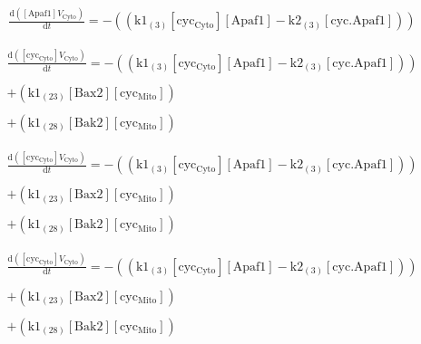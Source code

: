 \documentclass[a4paper,12pt]{article} %
\newcommand{\M}[1]{\mathrm{#1}}
\begin{document}
\begin{equation}
\begin{split}
\frac {\M{d}( {{\M{[Apaf1]}}    {V}_{\M{Cyto}} } ) }  {\M{d}{t} }  =  {  -  (( {{\M{k1}}_{\M{(3)}}    {\M{[cyc_{Cyto}]}}    {\M{[Apaf1]}}  -  {\M{k2}}_{\M{(3)}}    {\M{[cyc.Apaf1]}} } )) } 
\end{split}
\end{equation}


\begin{equation}
\begin{split}
\frac {\M{d}( {{\M{[cyc_{Cyto}]}}    {V}_{\M{Cyto}} } ) }  {\M{d}{t} }  =  {  -  (( {{\M{k1}}_{\M{(3)}}    {\M{[cyc_{Cyto}]}}    {\M{[Apaf1]}}  -  {\M{k2}}_{\M{(3)}}    {\M{[cyc.Apaf1]}} } )) } \\ 
  \\ 
   {  +  ( {{\M{k1}}_{\M{(23)}}    {\M{[Bax2]}}    {\M{[cyc_{Mito}]}} } ) } \\ 
  \\ 
   {  +  ( {{\M{k1}}_{\M{(28)}}    {\M{[Bak2]}}    {\M{[cyc_{Mito}]}} } ) } 
\end{split}
\end{equation}

\begin{equation}
\begin{split}
\frac {\M{d}( {{\M{[cyc_{Cyto}]}}    {V}_{\M{Cyto}} } ) }  {\M{d}{t} }  =  {  -  (( {{\M{k1}}_{\M{(3)}}    {\M{[cyc_{Cyto}]}}    {\M{[Apaf1]}}  -  {\M{k2}}_{\M{(3)}}    {\M{[cyc.Apaf1]}} } )) } \\ 
  \\ 
   {  +  ( {{\M{k1}}_{\M{(23)}}    {\M{[Bax2]}}    {\M{[cyc_{Mito}]}} } ) } \\ 
  \\ 
   {  +  ( {{\M{k1}}_{\M{(28)}}    {\M{[Bak2]}}    {\M{[cyc_{Mito}]}} } ) } 
\end{split}
\end{equation}

\begin{equation}
\begin{split}
\frac {\M{d}( {{\M{[cyc_{Cyto}]}}    {V}_{\M{Cyto}} } ) }  {\M{d}{t} }  =  {  -  (( {{\M{k1}}_{\M{(3)}}    {\M{[cyc_{Cyto}]}}    {\M{[Apaf1]}}  -  {\M{k2}}_{\M{(3)}}    {\M{[cyc.Apaf1]}} } )) } \\ 
  \\ 
   {  +  ( {{\M{k1}}_{\M{(23)}}    {\M{[Bax2]}}    {\M{[cyc_{Mito}]}} } ) } \\ 
  \\ 
   {  +  ( {{\M{k1}}_{\M{(28)}}    {\M{[Bak2]}}    {\M{[cyc_{Mito}]}} } ) } 
\end{split}
\end{equation}
\end{document}
